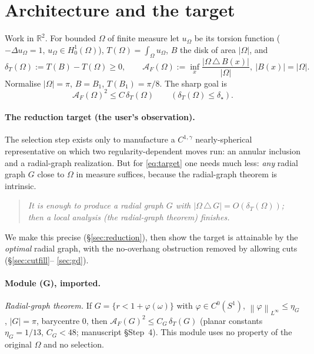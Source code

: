\documentclass[11pt]{article}
\theoremstyle{definition}
\newcommand{\R}{\mathbb R}
\newcommand{\Om}{\Omega}
\newcommand{\dT}{\delta_T}
\newcommand{\AF}{\mathcal A_F}
\newcommand{\norm}[1]{\left\|#1\right\|}
\newcommand{\abs}[1]{\left|#1\right|}
\begin{document}
\tableofcontents

\section{Architecture and the target}
\label{sec:arch}

Work in $\R^2$. For bounded $\Om$ of finite measure let $u_\Om$ be its
torsion function ($-\Delta u_\Om=1$, $u_\Om\in H^1_0(\Om)$),
$T(\Om)=\int_\Om u_\Om$, $B$ the disk of area $\abs\Om$, and
\[
   \dT(\Om):=T(B)-T(\Om)\ge0,\qquad
   \AF(\Om):=\inf_x\frac{\abs{\Om\,\triangle\,B(x)}}{\abs\Om},\ \abs{B(x)}=\abs\Om .
\]
Normalise $\abs\Om=\pi$, $B=B_1$, $T(B_1)=\pi/8$. The sharp goal is
\begin{equation}\label{eq:target}
   \AF(\Om)^2\le C\,\dT(\Om)\qquad(\dT(\Om)\le\delta_\star).
\end{equation}

\paragraph{The reduction target (the user's observation).}
The selection step exists only to manufacture a $C^{1,\gamma}$
nearly-spherical representative on which two regularity-dependent moves run:
an annular inclusion and a radial-graph realization. But for
\eqref{eq:target} one needs much less: \emph{any} radial graph $G$ close to
$\Om$ in measure suffices, because the radial-graph theorem is intrinsic.

\begin{quote}\itshape
It is enough to produce a radial graph $G$ with
$\abs{\Om\,\triangle\,G}=O(\dT(\Om))$; then a local analysis (the
radial-graph theorem) finishes.
\end{quote}

We make this precise (\S\ref{sec:reduction}), then show the target is
attainable by the \emph{optimal} radial graph, with the no-overhang
obstruction removed by allowing cuts (\S\ref{sec:cutfill}--%
\ref{sec:gd}).

\paragraph{Module (G), imported.}
\emph{Radial-graph theorem.} If $G=\{r<1+\varphi(\omega)\}$ with
$\varphi\in C^0(S^1)$, $\norm\varphi_{L^\infty}\le\eta_G$, $\abs G=\pi$,
barycentre $0$, then $\AF(G)^2\le C_G\,\dT(G)$ (planar constants
$\eta_G=1/13$, $C_G<48$; manuscript \S Step~4). This module uses no
property of the original $\Om$ and no selection.
\end{document}
